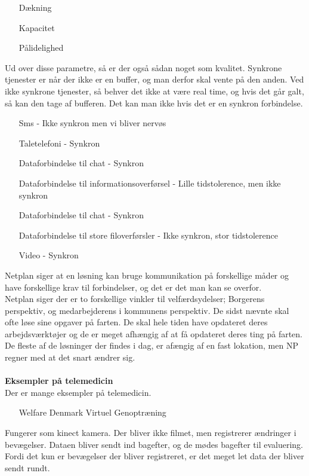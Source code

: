 \begin{itemize}
\item[Dækning]
\item[Kapacitet]
\item[Pålidelighed]
\end{itemize}
Ud over disse parametre, så er der også sådan noget som kvalitet. Synkrone tjenester er når der ikke er en buffer, og man derfor skal vente på den anden. Ved ikke synkrone tjenester, så behver det ikke at være real time, og hvis det går galt, så kan den tage af bufferen. Det kan man ikke hvis det er en synkron forbindelse. \\
\begin{itemize}
\item[Sms - Ikke synkron men vi bliver nervøs]
\item[Taletelefoni - Synkron]
\item[Dataforbindelse til chat - Synkron]
\item[Dataforbindelse til informationsoverførsel - Lille tidstolerence, men ikke synkron]
\item[Dataforbindelse til chat - Synkron]
\item[Dataforbindelse til store filoverførsler - Ikke synkron, stor tidstolerence]
\item[Video - Synkron]
\end{itemize}
Netplan siger at en løsning kan bruge kommunikation på forskellige måder og have forskellige krav til forbindelser, og det er det man kan se overfor.\\
Netplan siger der er to forskellige vinkler til velfærdsydelser; Borgerens perspektiv, og medarbejderens i kommunens perspektiv. De sidst nævnte skal ofte løse sine opgaver på farten. De skal hele tiden have opdateret deres arbejdsværktøjer og de er meget afhængig af at få opdateret deres ting på farten. De fleste af de løsninger der findes i dag, er afængig af en fast lokation, men NP regner med at det snart ændrer sig.\\ \\ 
\textbf{Eksempler på telemedicin}\\
Der er mange eksempler på telemedicin.\\
\begin{itemize}
\item[Welfare Denmark Virtuel Genoptræning]
\end{itemize}
Fungerer som kinect kamera. Der bliver ikke filmet, men registrerer ændringer i bevægelser. Dataen bliver sendt ind bagefter, og de mødes bagefter til evaluering. Fordi det kun er bevægelser der bliver registreret, er det meget let data der bliver sendt rundt. \\
